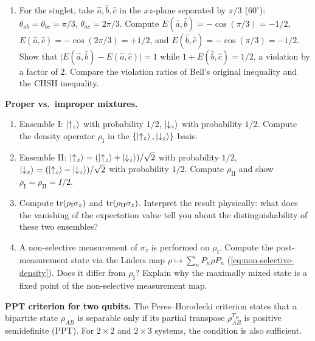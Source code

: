 \begin{problemset}
\begin{enumerate}
\item[(b)] For the singlet, take $\hat{a}, \hat{b}, \hat{c}$ in the $xz$-plane separated by $\pi/3$ ($60^\circ$): $\theta_{ab} = \theta_{bc} = \pi/3$, $\theta_{ac} = 2\pi/3$. Compute $E(\hat{a},\hat{b}) = -\cos(\pi/3) = -1/2$, $E(\hat{a},\hat{c}) = -\cos(2\pi/3) = +1/2$, and $E(\hat{b},\hat{c}) = -\cos(\pi/3) = -1/2$. Show that $\lvert E(\hat{a},\hat{b}) - E(\hat{a},\hat{c})\rvert = 1$ while $1 + E(\hat{b},\hat{c}) = 1/2$, a violation by a factor of $2$. Compare the violation ratios of Bell's original inequality and the CHSH inequality.
\end{enumerate}

\item[Exercise 7.7] \textbf{Proper vs.\ improper mixtures.}
\label{item:ex-proper-improper}

\begin{enumerate}
\item[(a)] Ensemble I: $\ket{\uparrow_z}$ with probability $1/2$, $\ket{\downarrow_z}$ with probability $1/2$. Compute the density operator $\rho_{\text{I}}$ in the $\{\ket{\uparrow_z}, \ket{\downarrow_z}\}$ basis.
\item[(b)] Ensemble II: $\ket{\uparrow_x} = (\ket{\uparrow_z} + \ket{\downarrow_z})/\sqrt{2}$ with probability $1/2$, $\ket{\downarrow_x} = (\ket{\uparrow_z} - \ket{\downarrow_z})/\sqrt{2}$ with probability $1/2$. Compute $\rho_{\text{II}}$ and show $\rho_{\text{I}} = \rho_{\text{II}} = I/2$.
\item[(c)] Compute $\mathrm{tr}(\rho_{\text{I}} \sigma_z)$ and $\mathrm{tr}(\rho_{\text{II}} \sigma_z)$. Interpret the result physically: what does the vanishing of the expectation value tell you about the distinguishability of these two ensembles?
\item[(d)] A non-selective measurement of $\sigma_z$ is performed on $\rho_{\text{I}}$. Compute the post-measurement state via the L\"uders map $\rho \mapsto \sum_n P_n \rho P_n$ (\eqref{eq:non-selective-density}). Does it differ from $\rho_{\text{I}}$? Explain why the maximally mixed state is a fixed point of the non-selective measurement map.
\end{enumerate}

\item[Exercise 7.8] \textbf{PPT criterion for two qubits.}
\label{item:ex-ppt}
The Peres--Horodecki criterion states that a bipartite state $\rho_{AB}$ is separable only if its partial transpose $\rho_{AB}^{T_B}$ is positive semidefinite (PPT). For $2 \times 2$ and $2 \times 3$ systems, the condition is also sufficient.


\end{problemset}
